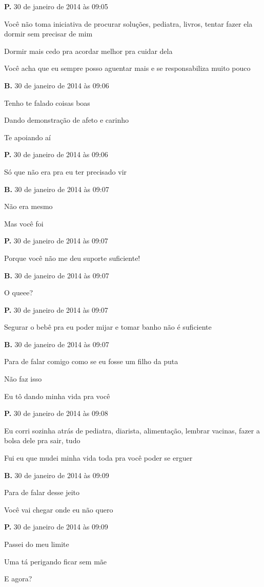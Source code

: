 {\textbf{P.} 30 de janeiro de 2014 às 09:05

Você não toma iniciativa de procurar soluções, pediatra, livros, tentar
fazer ela dormir sem precisar de mim

Dormir mais cedo pra acordar melhor pra cuidar dela

Você acha que eu sempre posso aguentar mais e se responsabiliza muito
pouco

\textbf{B.} 30 de janeiro de 2014 às 09:06

Tenho te falado coisas boas

Dando demonstração de afeto e carinho

Te apoiando aí

\textbf{P.} 30 de janeiro de 2014 às 09:06

Só que não era pra eu ter precisado vir

\textbf{B.} 30 de janeiro de 2014 às 09:07

Não era mesmo

Mas você foi

\textbf{P.} 30 de janeiro de 2014 às 09:07

Porque você não me deu suporte suficiente!

\textbf{B.} 30 de janeiro de 2014 às 09:07

O queee?

\textbf{P.} 30 de janeiro de 2014 às 09:07

Segurar o bebê pra eu poder mijar e tomar banho não é suficiente

\textbf{B.} 30 de janeiro de 2014 às 09:07

Para de falar comigo como se eu fosse um filho da puta

Não faz isso

Eu tô dando minha vida pra você

\textbf{P.} 30 de janeiro de 2014 às 09:08

Eu corri sozinha atrás de pediatra, diarista, alimentação, lembrar
vacinas, fazer a bolsa dele pra sair, tudo

Fui eu que mudei minha vida toda pra você poder se erguer

\textbf{B.} 30 de janeiro de 2014 às 09:09

Para de falar desse jeito

Você vai chegar onde eu não quero

\textbf{P.} 30 de janeiro de 2014 às 09:09

Passei do meu limite

Uma tá perigando ficar sem mãe

E agora?
}


